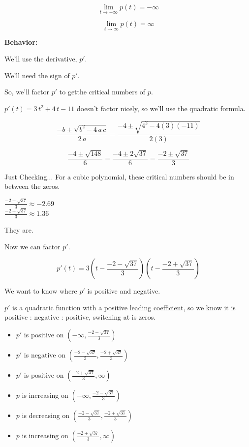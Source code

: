 \documentclass{ximera}
\begin{document}
\begin{example}
\[  \lim\limits_{t \to -\infty} p(t) = -\infty \]


\[  \lim\limits_{t \to \infty} p(t) = \infty \]


\textbf{Behavior:}

We'll use the derivative, $p'$.

We'll need the sign of $p'$. 

So, we'll factor $p'$ to getthe critical numbers of $p$.

$p'(t) = 3 \, t^2 + 4 \, t - 11$ doesn't factor nicely, so we'll use the quadratic formula.


\[ 
\frac{-b \pm \sqrt{b^2 - 4 \, a \, c}}{2 \, a} = \frac{-4 \pm \sqrt{4^2 - 4(3)(-11)}}{2(3)}
\]

\[ 
\frac{-4 \pm \sqrt{148}}{6} = \frac{-4 \pm 2 \sqrt{37}}{6} = \frac{-2 \pm \sqrt{37}}{3}
\]

Just Checking...
For a cubic polynomial, these critical numbers should be in between the zeros.

$ \frac{-2 - \sqrt{37}}{3} \approx -2.69 $ \\
$ \frac{-2 + \sqrt{37}}{3} \approx 1.36 $

They are.


Now we can factor $p'$.


\[ p'(t) = 3 \left( t - \frac{-2 - \sqrt{37}}{3} \right) \left( t - \frac{-2 + \sqrt{37}}{3}\right)
\]

We want to know where $p'$ is positive and negative.

$p'$ is a quadratic function with a positive leading coefficient, so we know it is positive : negative : positive, switching at is zeros.


\begin{itemize}
\item $p'$ is positive on $\left(-\infty, \frac{-2 - \sqrt{37}}{3} \right)$
\item $p'$ is negative on $\left(\frac{-2 - \sqrt{37}}{3}, \frac{-2 + \sqrt{37}}{3} \right)$
\item $p'$ is positive on $\left(\frac{-2 + \sqrt{37}}{3}, \infty \right)$
\end{itemize}


\begin{itemize}
\item $p$ is increasing on $\left(-\infty, \frac{-2 - \sqrt{37}}{3} \right)$
\item $p$ is decreasing on $\left(\frac{-2 - \sqrt{37}}{3}, \frac{-2 + \sqrt{37}}{3} \right)$
\item $p$ is increasing on $\left(\frac{-2 + \sqrt{37}}{3}, \infty \right)$
\end{itemize}







\end{example}
\end{document}
